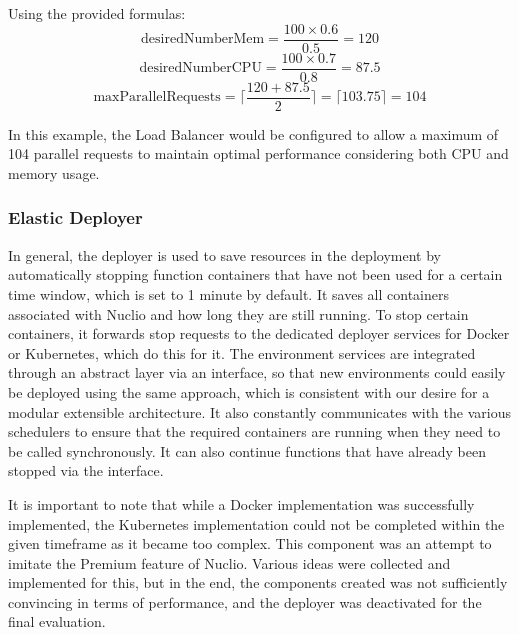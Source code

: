 Using the provided formulas:
\[
\text{{desiredNumberMem}} = \dfrac{100 \times 0.6}{0.5} = 120
\]
\[
\text{{desiredNumberCPU}} = \dfrac{100 \times 0.7}{0.8} = 87.5
\]
\[
\text{{maxParallelRequests}} = \lceil \frac{120 + 87.5}{2} \rceil = \lceil 103.75 \rceil = 104
\]

In this example, the Load Balancer would be configured to allow a maximum of 104 parallel requests to maintain optimal performance considering both CPU and memory usage.

\subsubsection{Elastic Deployer}
\label{sec:elastic-deploy}
In general, the deployer is used to save resources in the deployment by automatically stopping function containers that have not been used for a certain time window, which is set to 1 minute by default. It saves all containers associated with Nuclio and how long they are still running.
To stop certain containers, it forwards stop requests to the dedicated deployer services for Docker or Kubernetes, which do this for it. The environment services are integrated through an abstract layer via an interface, so that new environments could easily be deployed using the same approach, which is consistent with our desire for a modular extensible architecture.
It also constantly communicates with the various schedulers to ensure that the required containers are running when they need to be called synchronously. It can also continue functions that have already been stopped via the interface.

It is important to note that while a Docker implementation was successfully implemented, the Kubernetes implementation could not be completed within the given timeframe as it became too complex. This component was an attempt to imitate the Premium feature of Nuclio. Various ideas were collected and implemented for this, but in the end, the components created was not sufficiently convincing in terms of performance, and the deployer was deactivated for the final evaluation. 

